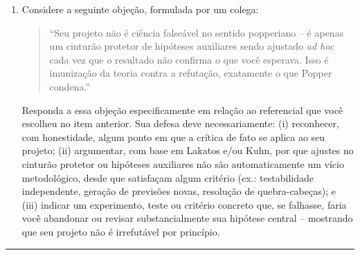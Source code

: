 \documentclass[10pt]{extarticle}
\begin{document}
\begin{enumerate}
\item Considere a seguinte objeção, formulada por um colega:

\begin{quote}
``Seu projeto não é ciência falseável no sentido popperiano -- é apenas um cinturão protetor de hipóteses auxiliares sendo ajustado \emph{ad hoc} cada vez que o resultado não confirma o que você esperava. Isso é imunização da teoria contra a refutação, exatamente o que Popper condena.''
\end{quote}

Responda a essa objeção especificamente em relação ao referencial que você escolheu no item anterior. Sua defesa deve necessariamente: (i) reconhecer, com honestidade, algum ponto em que a crítica de fato se aplica ao seu projeto; (ii) argumentar, com base em Lakatos e/ou Kuhn, por que ajustes no cinturão protetor ou hipóteses auxiliares não são automaticamente um vício metodológico, desde que satisfaçam algum critério (ex.: testabilidade independente, geração de previsões novas, resolução de quebra-cabeças); e (iii) indicar um experimento, teste ou critério concreto que, se falhasse, faria você abandonar ou revisar substancialmente sua hipótese central -- mostrando que seu projeto não é irrefutável por princípio.


\end{enumerate}

\vspace{8mm}
\hrule
\vspace{2mm}
\end{document}
